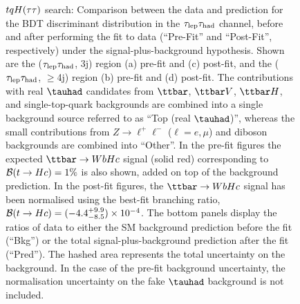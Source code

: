 \begin{figure}[htbp]
\begin{center}
\caption{\small{$tqH(\tau\tau)$ search: Comparison between the data and prediction for the BDT discriminant distribution in the
$\tau_{\mathrm{lep}} \tau_{\mathrm{had}}$ channel, before and after performing the fit to data  (``Pre-Fit'' and ``Post-Fit'', respectively) under the signal-plus-background hypothesis.
Shown are the ($\tau_{\mathrm{lep}} \tau_{\mathrm{had}}$, 3j) region (a) pre-fit and (c) post-fit, and the ($\tau_{\mathrm{lep}} \tau_{\mathrm{had}}$, $\geq$4j) region (b) pre-fit and (d) post-fit.
The contributions with real $\tauhad$ candidates from $\ttbar$,  $\ttbar V$, $\ttbar H$, and single-top-quark backgrounds are combined into
a single background source referred to as ``Top (real $\tauhad$)'', whereas the small contributions from 
$Z\to \ell^+\ell^-$ ($\ell = e, \mu$) and diboson backgrounds are combined into ``Other''. 
In the pre-fit figures the expected $\Hc$ signal (solid red) corresponding to $\mathcal{B}(t\to Hc)=1\%$ is also shown,
added on top of the background prediction. In the post-fit figures, the $\Hc$ signal has been normalised using the best-fit branching ratio, 
$\mathcal{B}(t\to Hc)=(-4.4^{+9.9}_{-8.5})\times 10^{-4}$.
The bottom panels display the ratios of data to either the SM background prediction before the fit (``Bkg'')  or the total signal-plus-background
prediction after the fit (``Pred''). 
The hashed area represents the total uncertainty on the background. 
In the case of the pre-fit background uncertainty, the normalisation uncertainty on the fake $\tauhad$ background is not included.}}
\label{fig:prepostfit_unblinded_WbHc_lh}
\end{center}
\end{figure}


